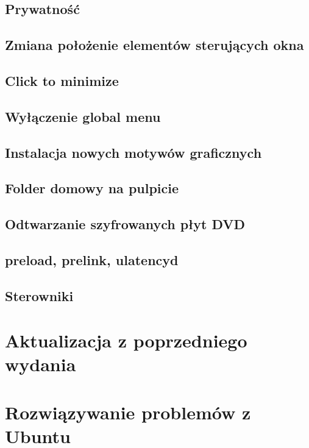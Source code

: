 \documentclass[a4paper,11pt,oneside]{mwart}
\begin{document}
        \subsection{Prywatność}
        \subsection{Zmiana położenie elementów sterujących okna}
        \subsection{Click to minimize}
        \subsection{Wyłączenie global menu}
        \subsection{Instalacja nowych motywów graficznych}
        \subsection{Folder domowy na pulpicie}
        \subsection{Odtwarzanie szyfrowanych płyt DVD}
        \subsection{preload, prelink, ulatencyd}
        \subsection{Sterowniki}
        \label{sterowniki}
\section{Aktualizacja z poprzedniego wydania}
\section{Rozwiązywanie problemów z Ubuntu}
\end{document}
